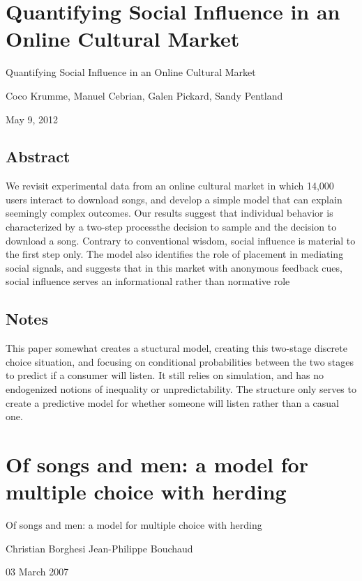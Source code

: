 \documentclass[12pt]{article}
\begin{document}
\section{Quantifying Social Influence in an Online Cultural Market}

Quantifying Social Influence in an Online Cultural Market\par
Coco Krumme, Manuel Cebrian, Galen Pickard, Sandy Pentland\par
May 9, 2012\par

\subsection{Abstract}
We revisit experimental data from an online cultural market
in which 14,000 users interact to download songs, and develop a simple
model that can explain seemingly complex outcomes. Our results suggest
that individual behavior is characterized by a two-step processthe
decision to sample and the decision to download a song.  Contrary to
conventional wisdom, social influence is material to the first step
only. The model also identifies the role of placement in mediating
social signals, and suggests that in this market with anonymous
feedback cues, social influence serves an informational rather than
normative role

\subsection{Notes}

This paper somewhat creates a stuctural model, creating this two-stage
discrete choice situation, and focusing on conditional probabilities
between the two stages to predict if a consumer will listen. It still
relies on simulation, and has no endogenized notions of inequality or
unpredictability. The structure only serves to create a predictive
model for whether someone will listen rather than a casual one.

\section{Of songs and men: a model for multiple choice with herding}
Of songs and men: a model for multiple choice with herding\par
Christian Borghesi Jean-Philippe Bouchaud\par
03 March 2007\par
\end{document}
